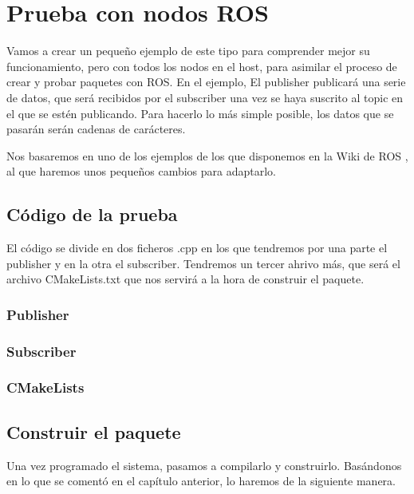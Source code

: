 \chapter{Prueba con nodos ROS}
Vamos a crear un pequeño ejemplo de este tipo para comprender mejor su funcionamiento, pero con todos los nodos en el host, para asimilar el proceso de crear y probar paquetes con ROS. En el ejemplo, El publisher publicará una serie de datos, que será recibidos por el subscriber una vez se haya suscrito al topic en el que se estén publicando. Para hacerlo lo más simple posible, los datos que se pasarán serán cadenas de carácteres.

Nos basaremos en uno de los ejemplos de los que disponemos en la Wiki de ROS \cite{ros-tutorials}, al que haremos unos pequeños cambios para adaptarlo.

	\section{Código de la prueba}
	El código se divide en dos ficheros .cpp en los que tendremos por una parte el publisher y en la otra el subscriber.	Tendremos un tercer ahrivo más, que será el archivo CMakeLists.txt que nos servirá a la hora de construir el paquete.
	
		\subsection{Publisher}
		
		
		\subsection{Subscriber}
		
		
		\subsection{CMakeLists}
		
	
	\section{Construir el paquete}
	Una vez programado el sistema, pasamos a compilarlo y construirlo. Basándonos en lo que se comentó en el capítulo anterior, lo haremos de la siguiente manera.
	
